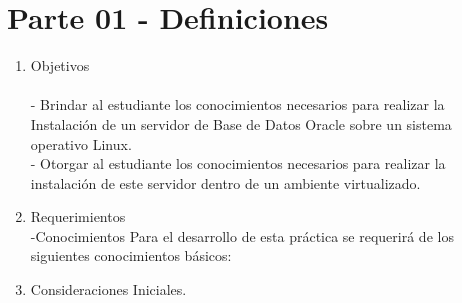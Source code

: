 \section{Parte 01 - Definiciones} 

\begin{enumerate}[1.]
	\item Objetivos
	\\\\- Brindar al estudiante los conocimientos necesarios para realizar la Instalación de un servidor de Base de Datos Oracle sobre un sistema operativo Linux.	
	\\- Otorgar al estudiante los conocimientos necesarios para realizar la instalación de este servidor dentro de un ambiente virtualizado.\\
	\item Requerimientos
	\\-Conocimientos
	\subitem Para el desarrollo de esta práctica se requerirá de los siguientes conocimientos básicos:

	\item Consideraciones Iniciales.


	
	

\end{enumerate} 
